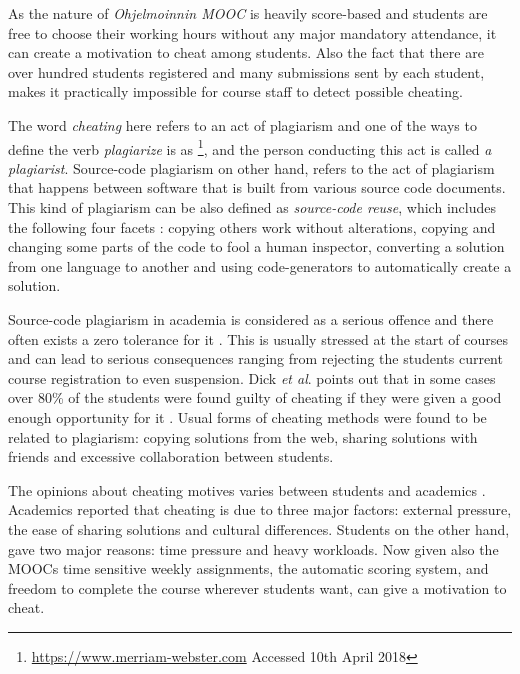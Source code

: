 \documentclass[english, grading]{tktltiki2}
\newcommand{\etal}{\textit{et al}. }
\theoremstyle{definition}
\theoremstyle{remark}
\numberwithin{equation}{section} %
\begin{document}
As the nature of \emph{Ohjelmoinnin MOOC} is heavily score-based and students are free to choose their working hours without any major mandatory attendance, it can create a motivation to cheat among  students. Also the fact that there are over hundred students registered and many submissions sent by each student, makes it practically impossible for course staff to detect possible cheating. 

The word \emph{cheating} here refers to an act of plagiarism and one of the ways to define the verb \emph{plagiarize} is as \footnote{\url{https://www.merriam-webster.com} Accessed 10th April 2018}, and the person conducting this act is called \emph{a plagiarist}. Source-code plagiarism on other hand, refers to the act of plagiarism that happens between software that is built from various source code documents. This kind of plagiarism can be also defined as \emph{source-code reuse}, which includes the following four facets \cite{TDSCP2008}: copying others work without alterations, copying and changing some parts of the code to fool a human inspector, converting a solution from one language to another and using code-generators to automatically create a solution. 


Source-code plagiarism in academia is considered as a serious offence and there often exists a zero tolerance for it \cite{TDSCP2008}. This is usually stressed at the start of courses and can lead to serious consequences ranging from rejecting the students current course registration to even suspension. Dick \etal points out that in some cases over 80\% of the students were found guilty of cheating if they were given a good enough opportunity for it \cite{Dick:2002:ASC:782941.783000}. Usual forms of cheating methods were found to be related to plagiarism: copying solutions from the web, sharing solutions with friends and excessive collaboration between students. 

The opinions about cheating motives varies between students and academics \cite{TDSCP2008}. Academics reported that cheating is due to three major factors: external pressure, the ease of sharing solutions and cultural differences. Students on the other hand, gave two major reasons: time pressure and heavy workloads. Now given also the MOOCs time sensitive weekly assignments, the automatic scoring system, and freedom to complete the course wherever students want, can give a motivation to cheat.
\end{document}
